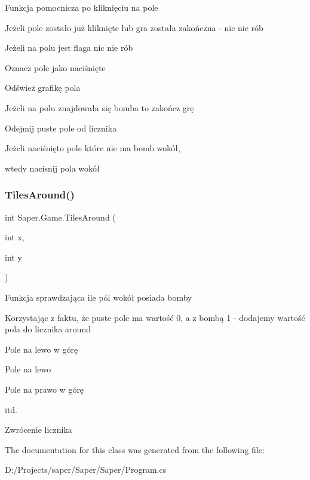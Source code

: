 Funkcja pomocnicza po kliknięciu na pole

Jeżeli pole zostało już kliknięte lub gra została zakończna -\/ nic nie rób

Jeżeli na polu jest flaga nic nie rób

Oznacz pole jako naciśnięte

Odśwież grafikę pola

Jeżeli na polu znajdowała się bomba to zakończ grę

Odejmij puste pole od licznika

Jeżeli naciśnięto pole które nie ma bomb wokół,

wtedy nacisnij pola wokół \mbox{\label{class_saper_1_1_game_a77640c9261a148c9e68f28b0b02b57c8}} 
\subsubsection{\texorpdfstring{TilesAround()}{TilesAround()}}
{\footnotesize\ttfamily int Saper.\+Game.\+Tiles\+Around (\begin{DoxyParamCaption}\item[{int}]{x,  }\item[{int}]{y }\end{DoxyParamCaption})}

Funkcja sprawdzająca ile pól wokół posiada bomby

Korzystając z faktu, że puste pole ma wartość 0, a z bombą 1 -\/ dodajemy wartość pola do licznika around

Pole na lewo w górę

Pole na lewo

Pole na prawo w górę

itd.

Zwrócenie licznika 

The documentation for this class was generated from the following file\+:\begin{DoxyCompactItemize}
\item 
D\+:/\+Projects/saper/\+Saper/\+Saper/Program.\+cs\end{DoxyCompactItemize}
